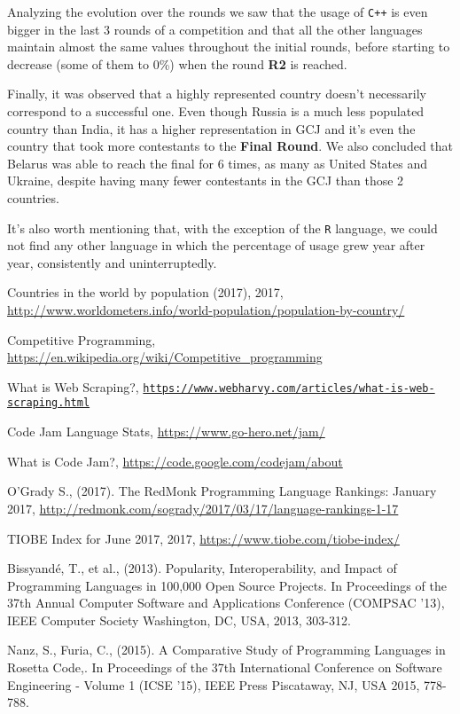 \documentclass{article}
\begin{document}
\begin{multicols*}{2}
Analyzing the evolution over the rounds we saw that the usage of \texttt{C++} is even bigger in the last 3 rounds of a competition and that all the other languages maintain almost the same values throughout the initial rounds, before starting to decrease (some of them to 0\%) when the round \textbf{R2} is reached.

Finally, it was observed that a highly represented country doesn't necessarily correspond to a successful one. Even though Russia is a much less populated country than India, it has a higher representation in GCJ and it's even the country that took more contestants to the \textbf{Final Round}. We also concluded that Belarus was able to reach the final for 6 times, as many as United States and Ukraine, despite having many fewer contestants in the GCJ than those 2 countries.

It's also worth mentioning that, with the exception of the \texttt{R} language, we could not find any other language in which the percentage of usage grew year after year, consistently and uninterruptedly.

\begin{thebibliography}{1}

\raggedright
Countries in the world by population (2017), 2017, \url{http://www.worldometers.info/world-population/population-by-country/}

\raggedright Competitive Programming, \url{https://en.wikipedia.org/wiki/Competitive_programming}


\raggedright What is Web Scraping?, \texttt{\url{https://www.webharvy.com/articles/what-is-web-scraping.html}}

\raggedright Code Jam Language Stats, \url{https://www.go-hero.net/jam/}

\raggedright What is Code Jam?, \url{https://code.google.com/codejam/about}

\raggedright
O'Grady S., (2017). The RedMonk Programming Language Rankings: January 2017, \url{http://redmonk.com/sogrady/2017/03/17/language-rankings-1-17}


\raggedright TIOBE Index for June 2017, 2017, \url{https://www.tiobe.com/tiobe-index/}

\raggedright Bissyandé, T., et al., (2013). Popularity, Interoperability, and Impact of Programming Languages
in 100,000 Open Source Projects. In Proceedings of the 37th Annual Computer Software and Applications Conference (COMPSAC '13), IEEE Computer Society Washington, DC, USA, 2013, 303-312.

\raggedright Nanz, S., Furia, C., (2015). A Comparative Study of Programming Languages in Rosetta Code,. In Proceedings of the 37th International Conference on Software Engineering - Volume 1 (ICSE '15), IEEE Press Piscataway, NJ, USA  2015, 778-788.

\end{thebibliography}

\end{multicols*}
\end{document}
